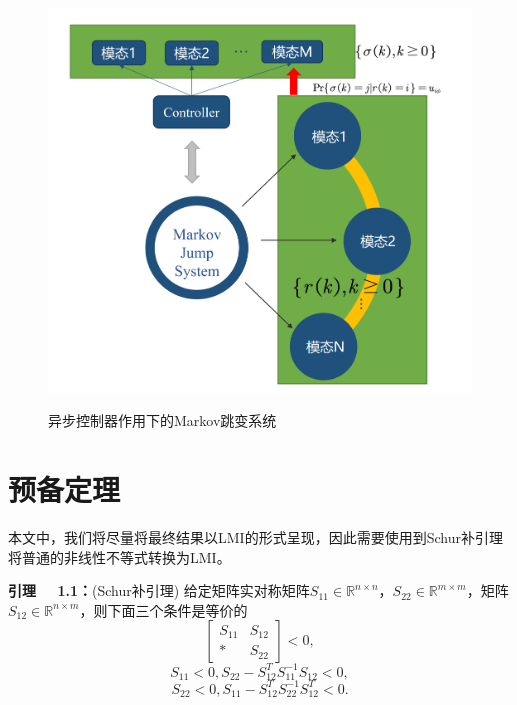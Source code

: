 	\begin{figure}[!htb] 
		\centering\includegraphics[scale=0.12]{./figures/introduction/asynsys.png}\\ 
		\caption{异步控制器作用下的Markov跳变系统}
		\label{intro_fig_asynsys}
	\end{figure}
	
\section{预备定理}
	本文中，我们将尽量将最终结果以LMI的形式呈现，因此需要使用到Schur补引理将普通的非线性不等式转换为LMI。
	
	{\bf 引理 \ \ 1.1：}(Schur补引理\cite{boyd1994linear}) 给定矩阵实对称矩阵$S_{11}\in\mathbb{R}^{n\times n}$，$S_{22}\in\mathbb{R}^{m\times m}$，矩阵$S_{12}\in\mathbb{R}^{n\times m}$，则下面三个条件是等价的
	\begin{equation}
		\begin{bmatrix}
			S_{11}&S_{12}\\
			*&S_{22}
		\end{bmatrix}<0,
	\end{equation} 
	\begin{equation}
		S_{11}<0,S_{22}-S^{T}_{12}S^{-1}_{11}S_{12}<0,
	\end{equation} 
	\begin{equation}
		S_{22}<0,S_{11}-S^{T}_{12}S^{-1}_{22}S^{T}_{12}<0.
	\end{equation} 
		
